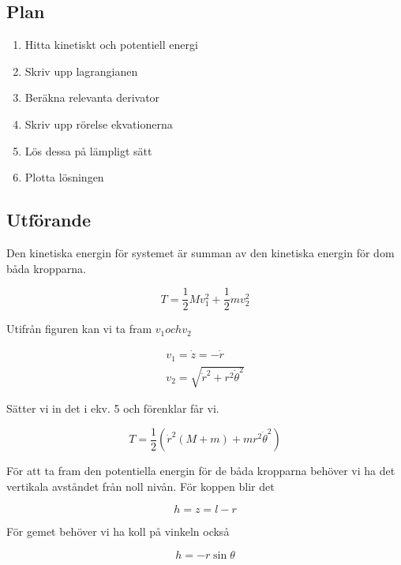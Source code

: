 \documentclass[a4paper]{article}
\begin{document}
\subsection*{Plan}

\begin{enumerate}
    \item Hitta kinetiskt och potentiell energi
    \item Skriv upp lagrangianen
    \item Beräkna relevanta derivator
    \item Skriv upp rörelse ekvationerna
    \item Lös dessa på lämpligt sätt
    \item Plotta lösningen
\end{enumerate}

\subsection*{Utförande}

Den kinetiska energin för systemet är summan av den kinetiska energin för dom båda kropparna.

\begin{equation}
    T = \frac{1}{2} Mv_1^2 + \frac{1}{2}mv_2^2
\end{equation}

Utifrån figuren kan vi ta fram $v_1 och v_2$

\begin{align}
    v_1 = \dot{z} = -\dot{r} \\
    v_2 = \sqrt{\dot{r}^2 + r^2\dot{\theta}^2}
\end{align}

Sätter vi in det i ekv. 5 och förenklar får vi.

\begin{equation}
    T = \frac{1}{2}(\dot{r}^2(M+m)+ mr^2\dot{\theta}^2)
\end{equation}

För att ta fram den potentiella energin för de båda kropparna behöver vi ha det vertikala avståndet från noll nivån. För koppen blir det

\begin{equation}
    h = z = l - r
\end{equation}

För gemet behöver vi ha koll på vinkeln också

\begin{equation}
    h = -r\sin\theta
\end{equation}
\end{document}
